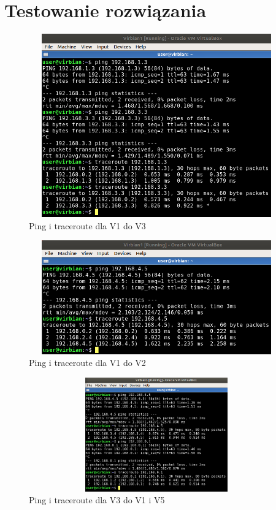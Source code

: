 \documentclass{article}
\begin{document}
\newpage
\section{Testowanie rozwiązania}
\begin{figure}[!htb]
\centering
\includegraphics[width=11cm,height=7.91cm]{v11.png}
\caption{Ping i traceroute dla V1 do V3}
\end{figure}
\begin{figure}[!htb]
\centering
\includegraphics[width=11cm,height=4.91cm]{v12.png}
\caption{Ping i traceroute dla V1 do V2}
\end{figure}

\begin{figure}[!htb]
\centering
\includegraphics[width=11cm,height=4.91cm]{v3.png}
\caption{Ping i traceroute dla V3 do V1 i V5}
\end{figure}
\end{document}

